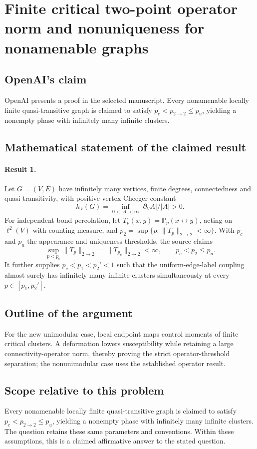 \documentclass[11pt]{article}
\begin{document}
\section*{Finite critical two-point operator norm and nonuniqueness for nonamenable graphs}

\subsection{OpenAI's claim}
OpenAI presents a proof in the selected manuscript. Every nonamenable locally finite quasi-transitive graph is claimed to satisfy $p_c<p_{2\to2}\leq p_u$, yielding a nonempty phase with infinitely many infinite clusters.

\subsection{Mathematical statement of the claimed result}
\paragraph{Result 1.} Let \(G=(V,E)\) have infinitely many vertices, finite degrees, connectedness and quasi-transitivity, with positive vertex Cheeger constant
\[
 h_V(G)=\inf_{0<|A|<\infty}|\partial_VA|/|A|>0.
\]
For independent bond percolation, let \(T_p(x,y)=\mathbb P_p(x\leftrightarrow y)\), acting on \(\ell^2(V)\) with counting measure, and \(p_2=\sup\{p:\|T_p\|_{2\to2}<\infty\}\). With \(p_c\) and \(p_u\) the appearance and uniqueness thresholds, the source claims
\[
 \sup_{p<p_c}\|T_p\|_{2\to2}=\|T_{p_c}\|_{2\to2}<\infty,
 \qquad p_c<p_2\le p_u.
\]
It further supplies \(p_c<p_1<p_2'<1\) such that the uniform-edge-label coupling almost surely has infinitely many infinite clusters simultaneously at every \(p\in[p_1,p_2']\).

\subsection{Outline of the argument}
For the new unimodular case, local endpoint maps control moments of finite critical clusters. A deformation lowers susceptibility while retaining a large connectivity-operator norm, thereby proving the strict operator-threshold separation; the nonunimodular case uses the established operator result.

\subsection{Scope relative to this problem}
Every nonamenable locally finite quasi-transitive graph is claimed to satisfy $p_c<p_{2\to2}\leq p_u$, yielding a nonempty phase with infinitely many infinite clusters. The question retains these same parameters and conventions. Within these assumptions, this is a claimed affirmative answer to the stated question.
\end{document}
